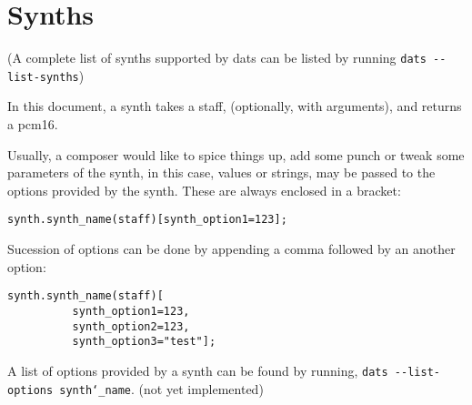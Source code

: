 
\section{Synths}
(A complete list of synths supported by dats can be listed by running \texttt{dats -{}-list-synths})

\np In this document, a synth takes a staff, (optionally, with arguments), and returns a pcm16.

\np Usually, a composer would like to spice things up, add some punch or tweak some
parameters of the synth, in this case, values or strings, may be passed to the options provided
by the synth. These are always enclosed in a bracket:

\begin{Verbatim}[frame=single]
      synth.synth_name(staff)[synth_option1=123];
\end{Verbatim}

Sucession of options can be done by appending a comma followed by an another option:

\begin{Verbatim}[frame=single]
      synth.synth_name(staff)[
          synth_option1=123,
          synth_option2=123,
          synth_option3="test"];
\end{Verbatim}

\np A list of options provided by a synth can be found by running,
\texttt{dats -{}-list-options synth\char`_name}. (not yet implemented)

